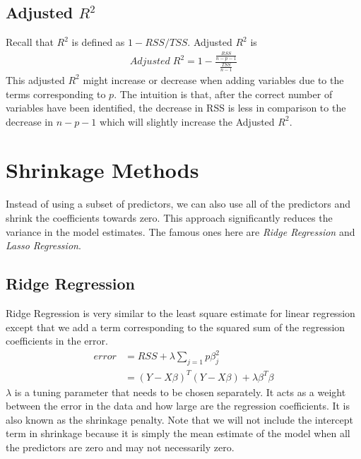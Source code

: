 \documentclass[../statistical_learning_notes.tex]{subfiles}
\begin{document}
    
    \subsection{Adjusted $R^{2}$}
    Recall that $R^{2}$ is defined as $1 - RSS/TSS$. Adjusted $R^{2}$ is
    \begin{align*}
        Adjusted\;R^{2} = 1 - \frac{\frac{RSS}{n-p-1}}{\frac{TSS}{n-1}}
    \end{align*}
    This adjusted $R^{2}$ might increase or decrease when adding variables due to the terms corresponding to $p$. The intuition is that, after the correct number of variables have been identified, the decrease in RSS is less in comparison to the decrease in $n-p-1$ which will slightly increase the Adjusted $R^{2}$.


    \section{Shrinkage Methods}
    Instead of using a subset of predictors, we can also use all of the predictors and shrink the coefficients towards zero. This approach significantly reduces the variance in the model estimates. The famous ones here are \emph{Ridge Regression} and \emph{Lasso Regression}.

    
    \subsection{Ridge Regression}
    Ridge Regression is very similar to the least square estimate for linear regression except that we add a term corresponding to the squared sum of the regression coefficients in the error.
    \begin{align*}
        error &= RSS + \lambda \sum_{j=1}{p}\beta_{j}^{2}\\
              &= (Y-X\beta)^{T}(Y-X\beta) + \lambda \beta^{T}\beta
    \end{align*}
    $\lambda$ is a tuning parameter that needs to be chosen separately. It acts as a weight between the error in the data and how large are the regression coefficients. It is also known as the shrinkage penalty.\newline
    Note that we will not include the intercept term in shrinkage because it is simply the mean estimate of the model when all the predictors are zero and may not necessarily zero.\newline
\end{document}
